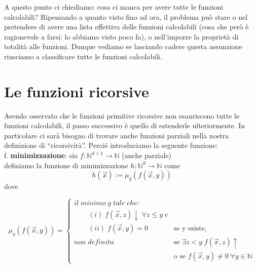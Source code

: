 A questo punto ci chiediamo: cosa ci manca per avere tutte le funzioni
calcolabili?
Ripensando a quanto visto fino ad ora, il problema pu\`o stare o nel pretendere
di avere una lista effettiva delle funzioni calcolabili (cosa che per\`o \`e
ragionevole a farsi: lo abbiamo visto poco fa), o nell'imporre la propriet\`a di
totalit\`a alle funzioni. Dunque vediamo se lasciando cadere questa assunzione
riusciamo a classificare tutte le funzioni calcolabili.


\section{Le funzioni ricorsive}
Avendo osservato che le funzioni primitive ricorsive non
esauriscono tutte le funzioni calcolabili, il passo successivo \`e  quello di
estenderle ulteriormente. In particolare ci sar\`a bisogno di trovare
anche funzioni parziali nella nostra definizione di ``ricorsivit\`a''. Perci\'o
introduciamo
la seguente funzione: \\

f. \textbf{minimizzazione}: sia $f: \mathbb{N}^{d+1} \to \mathbb{N}$ (anche
parziale)\\
definiamo la funzione di minimizzazione $h: \mathbb{N}^{d} \to \mathbb{N}$ come
$$ h(\vec{x}):= \mu_{y}(f(\vec{x},y)) $$
dove

\[\mu_{y}(f(\vec{x},y)) = 
\begin{cases}
il \; minimo \; y \; tale \; che: \\
\qquad (i) \; f(\vec{x},z)\downarrow \; \forall z \leq y \; e \\
\qquad (ii) \; f(\vec{x},y)=0 & \text{se y esiste,} \\
non \; definita \; & \text{se $\exists z < y \; f(\vec{x},z) \uparrow$}\\
 & \text{o se $f(\vec{x},y)\neq 0 \; \forall y \in \mathbb{N} $}
\end{cases} \]

